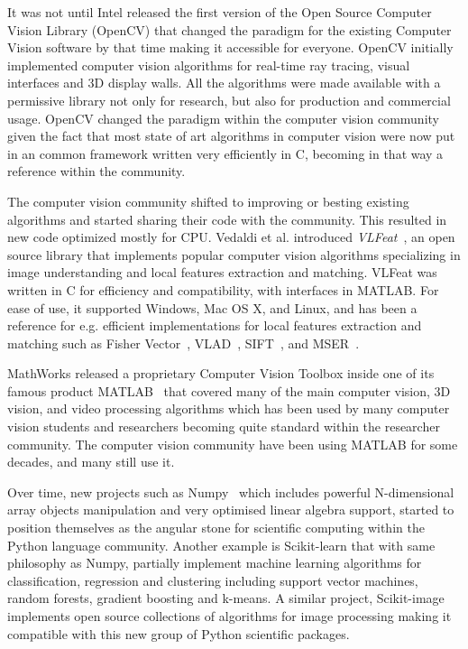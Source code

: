 It was not until Intel released the first version of the Open Source Computer Vision Library (OpenCV) that changed the paradigm for the existing Computer Vision software by that time making it accessible for everyone. OpenCV \citep{opencv} initially implemented computer vision algorithms for real-time ray tracing, visual interfaces and 3D display walls. All the algorithms were made available with a permissive library not only for research, but also for production and commercial usage. OpenCV changed the paradigm within the computer vision community given the fact that most   state of art algorithms in computer vision were now put in an common framework written very efficiently in C, becoming in that way a reference within the community.

The computer vision community shifted to improving or besting existing algorithms and started sharing their code with the community. This resulted in new code optimized mostly for CPU. Vedaldi et al. introduced \textit{VLFeat}~\citep{vedaldi08vlfeat}, an open source library that implements popular computer vision algorithms specializing in image understanding and local features extraction and matching. VLFeat was written in C for efficiency and compatibility, with interfaces in MATLAB. For ease of use, it supported Windows, Mac OS X, and Linux, and has been a reference for e.g. efficient implementations for local features extraction and matching such as Fisher Vector~\citep{Sanchez2013}, VLAD~\citep{VLAD2010}, SIFT~\citep{Lowe2004}, and MSER~\citep{Matas2002}.

MathWorks released a proprietary Computer Vision Toolbox inside one of its famous product MATLAB~\citep{MATLAB:2010} that covered many of the main computer vision, 3D vision, and video processing algorithms which has been used by many computer vision students and researchers becoming quite standard within the researcher community. The computer vision community have been using MATLAB for some decades, and many still use it.

Over time, new projects such as Numpy~\citep{oliphant2006guide} which includes powerful N-dimensional array objects manipulation and very optimised linear algebra support, started to position themselves as the angular stone for scientific computing within the Python language community. Another example is Scikit-learn \citep{scikit-learn} that with same philosophy as Numpy, partially implement machine learning algorithms  for classification, regression and clustering including support vector machines, random forests, gradient boosting and k-means. A similar project,  Scikit-image~\citep{scikit-image} implements open source collections of algorithms for image processing making it compatible with this new group of Python scientific packages.

